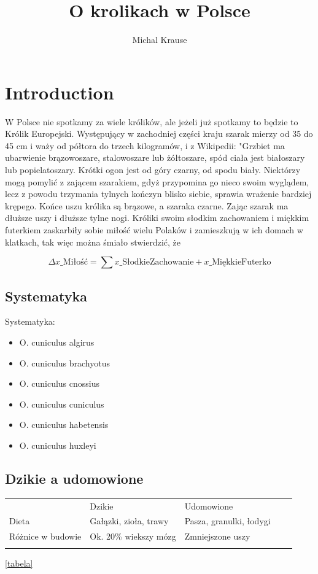 \documentclass{article}
\begin{document}
\title{O krolikach w Polsce}
\author{Michal Krause}

\maketitle

\section{Introduction}

W Polsce nie spotkamy za wiele królików, ale jeżeli już spotkamy to będzie to Królik Europejski. Występujący w zachodniej części kraju szarak mierzy od 35 do 45 cm i waży od półtora do trzech kilogramów, i z Wikipedii: "Grzbiet ma ubarwienie brązowoszare, stalowoszare lub żółtoszare, spód ciała jest białoszary lub popielatoszary. Krótki ogon jest od góry czarny, od spodu biały. Niektórzy mogą pomylić z zającem szarakiem, gdyż przypomina go nieco swoim wyglądem, lecz z powodu trzymania tylnych kończyn blisko siebie, sprawia wrażenie bardziej krępego. Końce uszu królika są brązowe, a szaraka czarne. Zając szarak ma dłuższe uszy i dłuższe tylne nogi. Króliki swoim słodkim zachowaniem i miękkim futerkiem zaskarbiły sobie miłość wielu Polaków i zamieszkują w ich domach w klatkach, tak więc można śmiało stwierdzić, że

\begin{equation}
\Delta x\_\text{Miłość} = \sum x\_\text{SłodkieZachowanie} + x\_\text{MiękkieFuterko}
\end{equation}

\subsection{Systematyka}

Systematyka:
\begin{itemize}
\item O. cuniculus algirus
\item O. cuniculus brachyotus
\item O. cuniculus cnossius
\item O. cuniculus cuniculus
\item O. cuniculus habetensis
\item O. cuniculus huxleyi
\end{itemize}

\subsection{Dzikie a udomowione}
\begin{table}[]
\centering
\begin{tabular}{lllll}
                  & Dzikie                & Udomowione              &  &  \\
Dieta             & Gałązki, zioła, trawy & Pasza, granulki, łodygi &  &  \\
Różnice w budowie & Ok. 20\% wiekszy mózg & Zmniejszone uszy        &  &  \\
                  &                       &                         &  & 
\end{tabular}
\end{table}
\ref{tabela}
\end{document}
